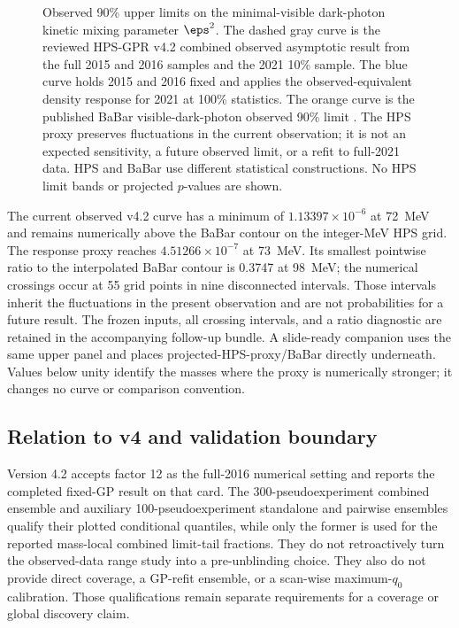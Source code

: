 \begin{figure}[H]
\centering
{}
\caption{Observed 90\% upper limits on the minimal-visible dark-photon kinetic
mixing parameter $\eps^2$.  The dashed gray curve is the reviewed HPS-GPR v4.2
combined observed asymptotic \CLs{} result from the full 2015 and 2016 samples
and the 2021 10\% sample.  The blue curve holds 2015 and 2016 fixed and applies
the observed-equivalent density response for 2021 at 100\% statistics.  The
orange curve is the published BaBar visible-dark-photon observed 90\% limit
\cite{BaBarDarkPhoton2014}.  The HPS proxy preserves fluctuations in the
current observation; it is not an expected sensitivity, a future observed
limit, or a refit to full-2021 data.  HPS and BaBar use different statistical
constructions.  No HPS limit bands or projected $p$-values are shown.}
\label{fig:results-v4p2-babar-response}
\end{figure}

The current observed v4.2 curve has a minimum of
$1.13397\times10^{-6}$ at 72~MeV and remains numerically above the BaBar
contour on the integer-MeV HPS grid.  The response proxy reaches
$4.51266\times10^{-7}$ at 73~MeV.  Its smallest pointwise ratio to the
interpolated BaBar contour is 0.3747 at 98~MeV; the numerical crossings occur
at 55 grid points in nine disconnected intervals.  Those intervals inherit
the fluctuations in the present observation and are not probabilities for a
future result.  The frozen inputs, all crossing intervals, and a ratio
diagnostic are retained in the accompanying follow-up bundle.  A slide-ready
companion uses the same upper panel and places
projected-HPS-proxy/BaBar directly underneath.  Values below unity identify
the masses where the proxy is numerically stronger; it changes no curve or
comparison convention.

\subsection{Relation to v4 and validation boundary}
\label{sec:results-v4p2-v4-context}

Version 4.2 accepts factor 12 as the full-2016 numerical setting and reports the
completed fixed-GP result on that card. The 300-pseudoexperiment combined
ensemble and auxiliary 100-pseudoexperiment standalone and pairwise ensembles
qualify their plotted conditional quantiles, while only the former is used for
the reported mass-local combined limit-tail fractions. They do not
retroactively turn the observed-data range study into a pre-unblinding choice.
They also do not provide direct \CLs{} coverage, a GP-refit ensemble, or a
scan-wise maximum-$q_0$ calibration. Those qualifications remain separate
requirements for a coverage or global discovery claim.

